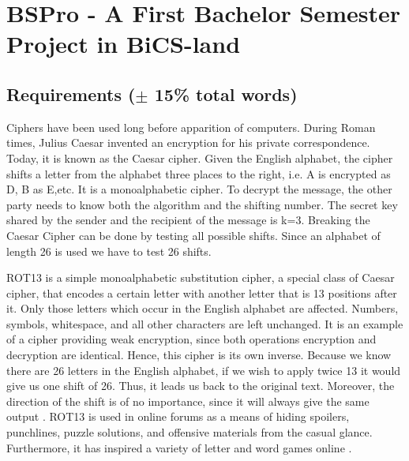 \section{BSPro - A First Bachelor Semester Project in BiCS-land}
\subsection{Requirements ($\pm$ 15\% total words)}

Ciphers have been used long before apparition of computers. During Roman times, Julius Caesar invented an encryption for his private correspondence. Today, it is known as the Caesar cipher. Given the English alphabet, the cipher shifts a letter from the alphabet three places to the right, i.e. A is encrypted as D, B as E,etc. It is a monoalphabetic cipher. To decrypt the message, the other party needs to know both the algorithm and the shifting number. The secret key shared by the sender and the recipient of the message is k=3. Breaking the Caesar Cipher can be done by testing all possible shifts. Since an alphabet of length 26 is used we have to test 26 shifts. 

ROT13 is a simple monoalphabetic substitution cipher, a special class of Caesar cipher, that encodes a certain letter with another letter that is 13 positions after it. Only those letters which occur in the English alphabet are affected. Numbers, symbols, whitespace, and all other characters are left unchanged. It is an example of a cipher providing weak encryption, since both operations encryption and decryption are identical. Hence, this cipher is its own inverse. Because we know there are 26 letters in the English alphabet, if we wish to apply twice 13 it would give us one shift of 26. Thus, it leads us back to the original text. Moreover, the direction of the shift is of no importance, since it will always give the same output \cite{swenson2008modern}.
ROT13 is used in online forums as a means of hiding spoilers, punchlines, puzzle solutions, and offensive materials from the casual glance. Furthermore, it has inspired a variety of letter and word games online \cite{wikirot13}. 

